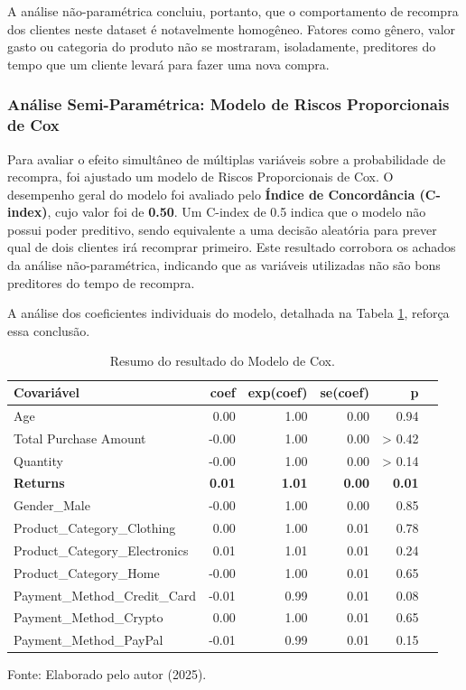 A análise não-paramétrica concluiu, portanto, que o comportamento de recompra dos clientes neste dataset é notavelmente homogêneo. Fatores como gênero, valor gasto ou categoria do produto não se mostraram, isoladamente, preditores do tempo que um cliente levará para fazer uma nova compra.

\subsubsection{Análise Semi-Paramétrica: Modelo de Riscos Proporcionais de Cox}
Para avaliar o efeito simultâneo de múltiplas variáveis sobre a probabilidade de recompra, foi ajustado um modelo de Riscos Proporcionais de Cox. O desempenho geral do modelo foi avaliado pelo \textbf{Índice de Concordância (C-index)}, cujo valor foi de \textbf{0.50}. Um C-index de 0.5 indica que o modelo não possui poder preditivo, sendo equivalente a uma decisão aleatória para prever qual de dois clientes irá recomprar primeiro. Este resultado corrobora os achados da análise não-paramétrica, indicando que as variáveis utilizadas não são bons preditores do tempo de recompra.

A análise dos coeficientes individuais do modelo, detalhada na Tabela \ref{tab:cox_summary}, reforça essa conclusão.

\begin{table}[h!]
\centering
\caption{Resumo do resultado do Modelo de Cox.}
\label{tab:cox_summary}
\begin{tabular}{lrrrrr}
\hline
\textbf{Covariável} & \textbf{coef} & \textbf{exp(coef)} & \textbf{se(coef)} & \textbf{p} \\
\hline
Age & 0.00 & 1.00 & 0.00 & 0.94	 \\
Total Purchase Amount & -0.00 & 1.00 & 0.00 & > 0.42 \\
Quantity & -0.00 & 1.00 & 0.00 & > 0.14 \\
\textbf{Returns} & \textbf{0.01} & \textbf{1.01} & \textbf{0.00} & \textbf{0.01} \\
Gender\_Male & -0.00 & 1.00 & 0.00 & 0.85 \\
Product\_Category\_Clothing & 0.00 & 1.00 & 0.01 & 0.78 \\
Product\_Category\_Electronics & 0.01 & 1.01 & 0.01 & 0.24 \\
Product\_Category\_Home & -0.00 & 1.00 & 0.01 & 0.65 \\
Payment\_Method\_Credit\_Card & -0.01 & 0.99 & 0.01 & 0.08 \\
Payment\_Method\_Crypto & 0.00 & 1.00 & 0.01 & 0.65 \\
Payment\_Method\_PayPal & -0.01 & 0.99 & 0.01 & 0.15 \\
\hline
\end{tabular}
\end{table}
\begin{flushleft}
\footnotesize Fonte: Elaborado pelo autor (2025).
\end{flushleft}

